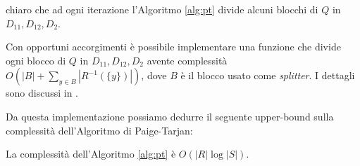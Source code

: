 \accente chiaro che ad ogni iterazione l'Algoritmo \ref{alg:pt} divide alcuni blocchi di $Q$ in $D_{11}, D_{12}, D_2$.

\begin{observation}
    Con opportuni accorgimenti è possibile implementare una funzione che divide ogni blocco di $Q$ in $D_{11}, D_{12}, D_2$ avente complessità $O(|B| + \sum_{y \in B} |R^{-1}(\{y\})|)$, dove $B$ è il blocco usato come \emph{splitter}. I dettagli sono discussi in \cite{paigetarjan}.
\end{observation}

Da questa implementazione possiamo dedurre il seguente upper-bound sulla complessità dell'Algoritmo di Paige-Tarjan:

\begin{theorem}
    La complessità dell'Algoritmo \ref{alg:pt} è $O(|R|\log |S|)$.
\end{theorem}
